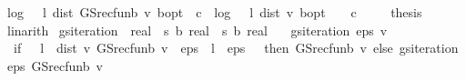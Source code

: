 \begin{isabellebody}
\ {\isachardoublequoteopen}log\ {\isacharparenleft}{\kern0pt}{}\ {\isacharslash}{\kern0pt}\ l{\isacharparenright}{\kern0pt}\ {\isacharparenleft}{\kern0pt}dist\ {\isacharparenleft}{\kern0pt}GS{\isacharunderscore}{\kern0pt}rec{\isacharunderscore}{\kern0pt}fun\isactrlsub b\ v{\isacharparenright}{\kern0pt}\ {\isasymnu}\isactrlsub b{\isacharunderscore}{\kern0pt}opt{\isacharparenright}{\kern0pt}\ {\isacharminus}{\kern0pt}\ c\ {\isasymle}\ log\ {\isacharparenleft}{\kern0pt}{}\ {\isacharslash}{\kern0pt}\ l{\isacharparenright}{\kern0pt}\ {\isacharparenleft}{\kern0pt}dist\ v\ {\isasymnu}\isactrlsub b{\isacharunderscore}{\kern0pt}opt{\isacharparenright}{\kern0pt}\ {\isacharminus}{\kern0pt}\ {}\ {\isacharminus}{\kern0pt}\ c{\isachardoublequoteclose}\ \isacommand{{\isachardot}{\kern0pt}}\isamarkupfalse%
\isanewline
\ \ \isamarkupfalse%
\ {\isacharquery}{\kern0pt}thesis\isanewline
\ \ \ \ \isamarkupfalse%
\ linarith\isanewline
{}\isamarkupfalse%
%
\endisatagproof
{\isafoldproof}%
%
\isadelimproof
\isanewline
%
\endisadelimproof
\isanewline
{}\isamarkupfalse%
\ gs{\isacharunderscore}{\kern0pt}iteration\ {\isacharcolon}{\kern0pt}{\isacharcolon}{\kern0pt}\ {\isachardoublequoteopen}real\ {\isasymRightarrow}\ {\isacharparenleft}{\kern0pt}{\isacharprime}{\kern0pt}s\ {\isasymRightarrow}\isactrlsub b\ real{\isacharparenright}{\kern0pt}\ {\isasymRightarrow}\ {\isacharparenleft}{\kern0pt}{\isacharprime}{\kern0pt}s\ {\isasymRightarrow}\isactrlsub b\ real{\isacharparenright}{\kern0pt}{\isachardoublequoteclose}\ \isanewline
\ \ {\isachardoublequoteopen}gs{\isacharunderscore}{\kern0pt}iteration\ eps\ v\ {\isacharequal}{\kern0pt}\isanewline
\ \ {\isacharparenleft}{\kern0pt}if\ {}\ {\isacharasterisk}{\kern0pt}\ l\ {\isacharasterisk}{\kern0pt}\ dist\ v\ {\isacharparenleft}{\kern0pt}GS{\isacharunderscore}{\kern0pt}rec{\isacharunderscore}{\kern0pt}fun\isactrlsub b\ v{\isacharparenright}{\kern0pt}\ {\isacharless}{\kern0pt}\ eps\ {\isacharasterisk}{\kern0pt}\ {\isacharparenleft}{\kern0pt}{}{\isacharminus}{\kern0pt}l{\isacharparenright}{\kern0pt}\ {\isasymor}\ eps\ {\isasymle}\ {}\ then\ GS{\isacharunderscore}{\kern0pt}rec{\isacharunderscore}{\kern0pt}fun\isactrlsub b\ v\ else\ gs{\isacharunderscore}{\kern0pt}iteration\ eps\ {\isacharparenleft}{\kern0pt}GS{\isacharunderscore}{\kern0pt}rec{\isacharunderscore}{\kern0pt}fun\isactrlsub b\ v{\isacharparenright}{\kern0pt}{\isacharparenright}{\kern0pt}{\isachardoublequoteclose}\isanewline
%
\isadelimproof

\end{isabellebody}
